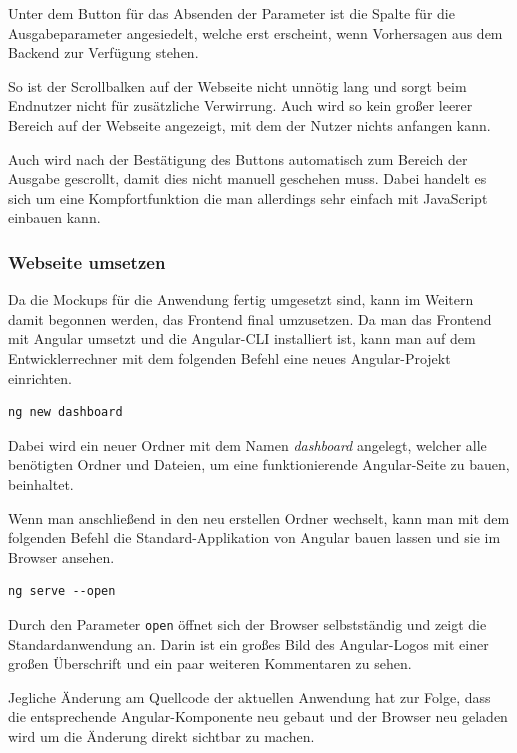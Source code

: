 Unter dem Button für das Absenden der Parameter ist die Spalte für die Ausgabeparameter angesiedelt, welche erst
erscheint, wenn Vorhersagen aus dem Backend zur Verfügung stehen.

So ist der Scrollbalken auf der Webseite nicht unnötig lang und sorgt beim Endnutzer nicht für zusätzliche Verwirrung.
Auch wird so kein großer leerer Bereich auf der Webseite angezeigt, mit dem der Nutzer nichts anfangen kann.

Auch wird nach der Bestätigung des Buttons automatisch zum Bereich der Ausgabe gescrollt, damit dies nicht manuell
geschehen muss. Dabei handelt es sich um eine Kompfortfunktion die man allerdings sehr einfach mit JavaScript einbauen
kann.

\subsubsection{Webseite umsetzen}
Da die Mockups für die Anwendung fertig umgesetzt sind, kann im Weitern damit begonnen werden, das Frontend final
umzusetzen. Da man das Frontend mit Angular umsetzt und die Angular-CLI installiert ist, kann man auf dem
Entwicklerrechner mit dem folgenden Befehl eine neues Angular-Projekt einrichten.

\begin{lstlisting}[caption=Einrichten eines neuen Angular-Projektes, label=ls:umsetzung_angular]
    ng new dashboard
\end{lstlisting}

Dabei wird ein neuer Ordner mit dem Namen \textit{dashboard} angelegt, welcher alle benötigten Ordner und Dateien, um
eine funktionierende Angular-Seite zu bauen, beinhaltet.

Wenn man anschließend in den neu erstellen Ordner wechselt, kann man mit dem folgenden Befehl die Standard-Applikation
von Angular bauen lassen und sie im Browser ansehen.

\begin{lstlisting}[caption=Bereitstellen der Angular-Webseite, label=ls:umsetzung_angularserve]
    ng serve --open
\end{lstlisting}

Durch den Parameter \texttt{open} öffnet sich der Browser selbstständig und zeigt die Standardanwendung an. Darin ist
ein großes Bild des Angular-Logos mit einer großen Überschrift und ein paar weiteren Kommentaren zu sehen.

Jegliche Änderung am Quellcode der aktuellen Anwendung hat zur Folge, dass die entsprechende Angular-Komponente neu
gebaut und der Browser neu geladen wird um die Änderung direkt sichtbar zu machen.

